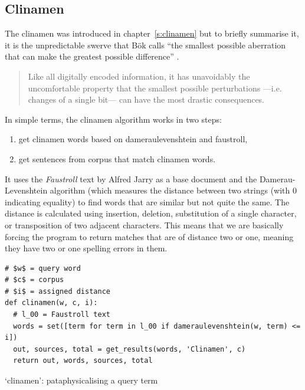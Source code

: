 \subsection{Clinamen}
\label{s:clinamenalgo}

The clinamen was introduced in chapter~\ref{s:clinamen} but to briefly summarise it, it is the unpredictable swerve that Bök calls ``the smallest possible aberration that can make the greatest possible difference'' \citeyear{Boek2002}.

\begin{quotation}
  Like all digitally encoded information, it has unavoidably the uncomfortable property that the smallest possible perturbations —i.e. changes of a single bit— can have the most drastic consequences. 
\end{quotation}

In simple terms, the clinamen algorithm works in two steps:
\begin{enumerate}
  \item get clinamen words based on dameraulevenshtein and faustroll,
  \item get sentences from corpus that match clinamen words.
\end{enumerate}

It uses the \textit{Faustroll} text by Alfred Jarry \citeyear{Jarry1996} as a base document and the Damerau-Levenshtein algorithm \autocite{Damerau1964, Levenshtein1966} (which measures the distance between two strings (with \num{0} indicating equality) to find words that are similar but not quite the same. The distance is calculated using insertion, deletion, substitution of a single character, or transposition of two adjacent characters. This means that we are basically forcing the program to return matches that are of distance two or one, meaning they have two or one spelling errors in them.

\begin{listing}[!htbp] %
  \begin{verbatim}
# $w$ = query word
# $c$ = corpus
# $i$ = assigned distance
def clinamen(w, c, i):
  # l_00 = Faustroll text
  words = set([term for term in l_00 if dameraulevenshtein(w, term) <= i])
  out, sources, total = get_results(words, 'Clinamen', c)
  return out, words, sources, total
  \end{verbatim}
\caption[`clinamen' function]{`clinamen': pataphysicalising a query term}
\label{code:clinamen}
\end{listing}

